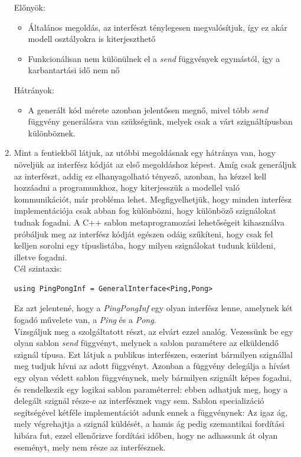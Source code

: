 \documentclass[a4paper,12pt]{report}
\begin{document}
\begin{enumerate}
Előnyök:
\begin{itemize}
\item Általános megoldás, az interfészt ténylegesen megvalósítjuk, így ez akár modell osztályokra is kiterjeszthető
\item Funkcionálisan nem különülnek el a \textit{send} függvények egymástól, így a karbantartási idő nem nő
\end{itemize}
Hátrányok:
\begin{itemize}
\item A generált kód mérete azonban jelentősen megnő, mivel több \textit{send} függvény generálásra van szükségünk, melyek csak a várt szignáltípusban különböznek.
\end{itemize}
\item Mint a fentiekből látjuk, az utóbbi megoldásnak egy hátránya van, hogy növeljük az interfész kódját az első megoldáshoz képest. Amíg csak generáljuk az interfészt, addig ez elhanyagolható tényező, azonban, ha kézzel kell hozzáadni a programunkhoz, hogy kiterjesszük a modellel való kommunikációt, már probléma lehet. Megfigyelhetjük, hogy minden interfész implementációja csak abban fog különbözni, hogy különböző szignálokat tudnak fogadni. A C++ sablon metaprogramozási lehetőségeit kihasználva próbáljuk meg az interfész kódját egészen odáig szűkíteni, hogy csak fel kelljen sorolni egy típuslistába, hogy milyen szignálokat tudunk küldeni, illetve fogadni. \\
Cél szintaxis: 
\begin{lstlisting}
using PingPongInf = GeneralInterface<Ping,Pong>
\end{lstlisting}
Ez azt jelentené, hogy a \textit{PingPongInf} egy olyan interfész lenne, amelynek két fogadó művelete van, a \textit{Ping} és a \textit{Pong}.\\
Vizsgáljuk meg a szolgáltatott részt, az elvárt ezzel analóg. Vezessünk be egy olyan sablon \textit{send} függvényt, melynek a sablon paramétere az elküldendő szignál típusa. Ezt látjuk a publikus interfészen, eszerint bármilyen szignállal meg tudjuk hívni az adott függvényt. Azonban a függvény delegálja a hívást egy olyan védett sablon függvénynek, mely bármilyen szignált képes fogadni, és rendelkezik egy logikai sablon paraméterrel: ebben adhatjuk meg, hogy a delegált szignál része-e az interfésznek vagy sem. 
Sablon specializáció segítségével kétféle implementációt adunk ennek a függvénynek: Az igaz ág, mely végrehajtja a szignál küldését, a hamis ág pedig szemantikai fordítási hibára fut, ezzel ellenőrizve fordítási időben, hogy ne adhassunk át olyan eseményt, mely nem része az interfésznek. \\

\end{enumerate}
\end{document}
